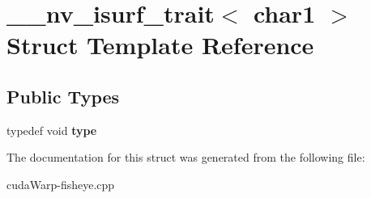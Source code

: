 \hypertarget{struct____nv__isurf__trait_3_01char1_01_4}{}\section{\+\_\+\+\_\+nv\+\_\+isurf\+\_\+trait$<$ char1 $>$ Struct Template Reference}
\label{struct____nv__isurf__trait_3_01char1_01_4}
\subsection*{Public Types}
\begin{DoxyCompactItemize}
\item 
typedef void {\bfseries type}\hypertarget{struct____nv__isurf__trait_3_01char1_01_4_a24d315d42741799842e8d7ce03bd29a6}{}\label{struct____nv__isurf__trait_3_01char1_01_4_a24d315d42741799842e8d7ce03bd29a6}

\end{DoxyCompactItemize}


The documentation for this struct was generated from the following file\+:\begin{DoxyCompactItemize}
\item 
cuda\+Warp-\/fisheye.\+cpp\end{DoxyCompactItemize}
